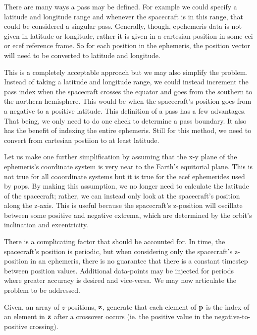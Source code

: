 There are many ways a pass may be defined. For example we could specify a
latitude and longitude range and whenever the spacecraft is in this range, that
could be considered a singular pass.  Generally, though, epehemeris data is not
given in latitude or longitude, rather it is given in a cartesian position in
some \gls{eci} or \gls{ecef} reference frame.  So for each position in the
ephemeris, the position vector will need to be converted to latitude and
longitude. 

This is a completely acceptable approach but we may also simplify the problem.
Instead of taking a latitude and longitude range, we could instead increment
the pass index when the spacecraft crosses the equator and goes from the
southern to the northern hemisphere. This would be when the spacecraft's
position goes from a negative to a positive latitude. This definition of a pass
has a few advantages. That being, we only need to do one check to determine a
pass boundary. It also has the benefit of indexing the entire ephemeris. Still
for this method, we need to convert from cartesian postiion to at least
latitude.

Let us make one further simplification by assuming that the x-y plane of the
ephemeris's coordinate system is very near to the Earth's equitorial plane.
This is not true for all cooordinate systems but it is true for the \gls{ecef}
ephemerides used by \gls{pops}. By making this assumption, we no longer need to
calculate the latitude of the spacecraft; rather, we can instead only look at
the spacecraft's position along the z-axis. This is useful because the
spacecraft's z-position will oscillate between some positive and negative
extrema, which are determined by the orbit's inclination and excentricity. 

There is a complicating factor that should be accounted for. In time, the
spacecraft's position is periodic, but when considering only the spacecraft's
z-position in an ephemeris, there is no guarantee that there is a constant
timestep between position values. Additional data-points may be injected for
periods where greater accuracy is desired and vice-versa. We may now articulate
the problem to be addressed.


Given, an array of $z$-positions, $\bm{\mathrm{z}}$, generate
that each element of $\bm{\mathrm{p}}$ is the index of an element in $\bm{\mathrm{z}}$ after a
crossover occurs (ie. the positive value in the negative-to-positive
crossing).


